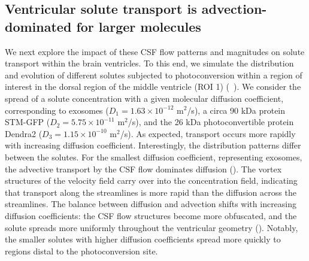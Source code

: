 \documentclass{WileyMSP-template}
\begin{document}
\subsection{Ventricular solute transport is advection-dominated for larger molecules}
We next explore the impact of these CSF flow patterns and magnitudes
on solute transport within the brain ventricles.
To this end, we simulate the distribution and evolution
of different solutes subjected to photoconversion within a region of
interest in the dorsal region of the middle ventricle (ROI 1)
(~). We consider the spread of
a solute concentration with a given molecular diffusion coefficient,
corresponding to exosomes ($D_1 = 1.63 \times 10^{-12}$ m$^2$/s),
a circa 90 kDa protein STM-GFP ($D_2 = 5.75 \times 10^{-11}$ m$^2$/s),
and the 26 kDa photoconvertible protein  Dendra2 ($D_3 = 1.15 \times 10^{-10}$ m$^2$/s).
As expected, transport occurs more
rapidly with increasing diffusion coefficient. Interestingly, the
distribution patterns differ between the solutes.
For the smallest diffusion coefficient, representing
exosomes, the advective transport by the CSF flow dominates diffusion
(). The vortex structures of the velocity field
carry over into the concentration field, indicating that transport
along the streamlines is more rapid than the diffusion across the
streamlines. The balance between diffusion and advection shifts with
increasing diffusion coefficients: the CSF flow structures become more
obfuscated, and the solute spreads more uniformly throughout the
ventricular geometry (). Notably, the
smaller solutes with higher diffusion coefficients spread more quickly
to regions distal to the photoconversion site.
\end{document}
